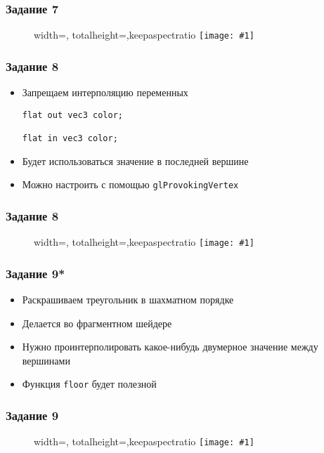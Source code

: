 \documentclass{beamer}
\newcommand{\slideimage}[1]{
  \begin{figure}
    \begin{adjustbox}{width=\textwidth, totalheight=\textheight-2\baselineskip-2\baselineskip,keepaspectratio}
      \texttt{[image: \#1]}
    \end{adjustbox}
  \end{figure}
}
\begin{document}
\begin{frame}[fragile]
\frametitle{Задание 7}
\slideimage{task_7.png}
\end{frame}

\begin{frame}[fragile]
\frametitle{Задание 8}
\begin{itemize}
\item Запрещаем интерполяцию переменных
\begin{verbatim}
flat out vec3 color;

flat in vec3 color;
\end{verbatim}
\item Будет использоваться значение в последней вершине
\item Можно настроить с помощью \verb|glProvokingVertex|
\end{itemize}
\end{frame}

\begin{frame}[fragile]
\frametitle{Задание 8}
\slideimage{task_8.png}
\end{frame}

\begin{frame}[fragile]
\frametitle{Задание 9*}
\begin{itemize}
\item Раскрашиваем треугольник в шахматном порядке
\item Делается во фрагментном шейдере
\item Нужно проинтерполировать какое-нибудь двумерное значение между вершинами
\item Функция \verb|floor| будет полезной
\end{itemize}
\end{frame}

\begin{frame}[fragile]
\frametitle{Задание 9}
\slideimage{task_9.png}
\end{frame}
\end{document}
